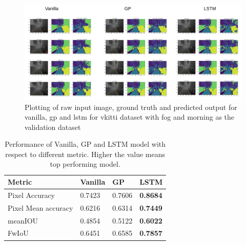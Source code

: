 	\begin{figure}[h]
		\centering
		\includegraphics[width=17cm]{images/unet_vkitti_two.png}
		\caption{Plotting of raw input image, ground truth and predicted output for vanilla, gp and lstm for vkitti dataset with fog and morning as the validation dataset}
		\label{fig:vkitti_unet_two}
	\end{figure}

	\begin{table}
		\begin{center}
			\begin{tabular}{ | l | p{4cm} | p{4cm} | p{4cm} |}
				\hline
				
				\cellcolor{purple!30}Metric & \cellcolor{purple!30}Vanilla & \cellcolor{purple!30}GP & \cellcolor{purple!30}LSTM\\ \hline
				
				Pixel Accuracy & 0.7423 & 0.7606 & {\bf 0.8684}  \\ \hline 
				Pixel Mean accuracy & 0.6216 & 0.6314 & { \bf 0.7449} \\ \hline
				meanIOU & 0.4854 & 0.5122 & { \bf 0.6022}  \\ \hline
				FwIoU & 0.6451 & 0.6585 & { \bf 0.7857} \\ \hline
				\hline
			\end{tabular}
			\caption{Performance of Vanilla, GP and LSTM model with respect to different metric. Higher the value means top performing model.}
			\label{table:unet_vkitti_two_classes}
		\end{center}
	\end{table}
	
